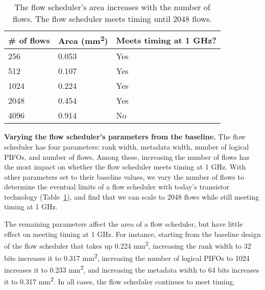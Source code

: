 \begin{table}
\begin{small}
\begin{tabular}{|p{}|p{}|p{}|}
\hline
\# of flows & Area (mm\textsuperscript{2}) & Meets timing at 1 GHz? \\
\hline
256 & 0.053 & Yes \\
\hline
512 & 0.107 & Yes \\
\hline
1024 & 0.224 & Yes \\
\hline
2048 & 0.454 & Yes \\
\hline
4096 & 0.914 & No \\
\hline
\end{tabular}
\end{small}
\caption{The flow scheduler's area increases with the number of
flows. The flow scheduler meets timing until 2048 flows.}
\label{tab:num_flows}
\end{table}

\medskip
\noindent
\textbf{Varying the flow scheduler's parameters from the baseline.}
The flow scheduler has four parameters: rank width, metadata width, number of
logical PIFOs, and number of flows. Among these, increasing the number of flows
has the most impact on whether the flow scheduler meets timing at 1 GHz.   With other parameters set to their baseline values, we vary the number
of flows to determine the eventual limits of a flow scheduler with today's
transistor technology (Table~\ref{tab:num_flows}), and find that we can scale
to 2048 flows while still meeting timing at 1 GHz.

The remaining parameters affect the area of a flow scheduler, but have
little effect on meeting timing at 1 GHz. For instance, starting from
the baseline design of the flow scheduler that takes up 0.224
\si{\milli\metre\squared}, increasing the rank width to 32 bits increases it
 to 0.317 \si{\milli\metre\squared}, increasing the number of logical
PIFOs to 1024 increases it to 0.233 \si{\milli\metre\squared}, and
increasing the metadata width to 64 bits increases it to 0.317
\si{\milli\metre\squared}. In all cases, the flow scheduler continues to meet timing.


